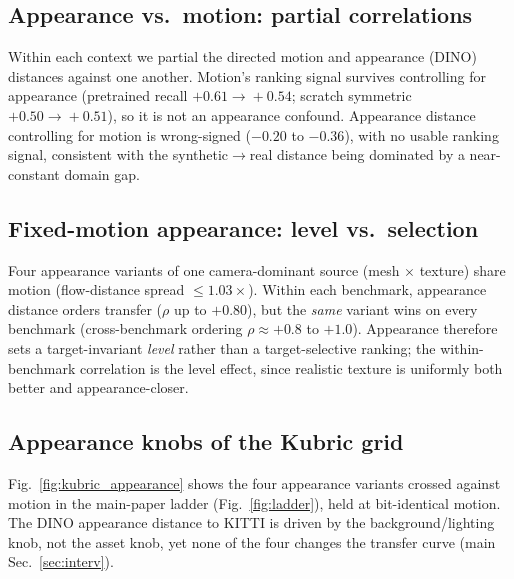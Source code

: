 \documentclass[runningheads]{llncs}
\begin{document}
\subsection{Appearance vs.\ motion: partial correlations}
Within each context we partial the directed motion and appearance (DINO)
distances against one another. Motion's ranking signal survives controlling
for appearance (pretrained recall $+0.61\!\to\!+0.54$; scratch symmetric
$+0.50\!\to\!+0.51$), so it is not an appearance confound. Appearance distance
controlling for motion is wrong-signed ($-0.20$ to $-0.36$), with no usable ranking
signal, consistent with the synthetic$\to$real distance being dominated by a
near-constant domain gap.
\begin{table}[h]\centering\small

\caption{Raw and partial within-context Spearman correlations of transfer with
the directed motion and appearance distances.}
\label{tab:new_partial}
\end{table}

\subsection{Fixed-motion appearance: level vs.\ selection}
Four appearance variants of one camera-dominant source (mesh $\times$ texture)
share motion (flow-distance spread $\le 1.03\times$). Within each benchmark,
appearance distance orders transfer ($\rho$ up to $+0.80$), but the
\emph{same} variant wins on every benchmark (cross-benchmark ordering
$\rho \approx +0.8$ to $+1.0$). Appearance therefore sets a target-invariant
\emph{level} rather than a target-selective ranking; the within-benchmark correlation
is the level effect, since realistic texture is uniformly both better and
appearance-closer.
\begin{table}[h]\centering\small

\caption{Peak PCK of four fixed-motion appearance variants across benchmarks.
Within-benchmark $\rho$(pck,$-$appearance dist.) is $+0.60/+0.80/+0.80$; the
cross-benchmark ordering correlation is $+0.80/+1.00/+0.80$, the same variant
wins everywhere (level, not selection).}
\label{tab:new_fixedmotion}
\end{table}

\subsection{Appearance knobs of the Kubric grid}
Fig.~\ref{fig:kubric_appearance} shows the four appearance variants crossed against
motion in the main-paper ladder (Fig.~\ref{fig:ladder}), held at bit-identical
motion. The DINO appearance distance to KITTI is driven by the
background/lighting knob, not the asset knob, yet none of the four changes the
transfer curve (main Sec.~\ref{sec:interv}).
\end{document}

